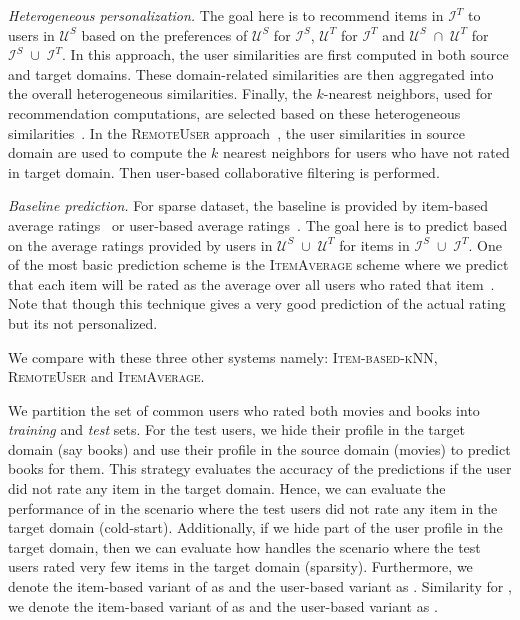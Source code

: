{\it Heterogeneous personalization.} The goal here is to recommend items in $\mathcal{I}^T$ to users in $\mathcal{U}^S$ based on the preferences of $\mathcal{U}^S$ for $\mathcal{I}^S$, $\mathcal{U}^T$ for $\mathcal{I}^T$ and $\mathcal{U}^S\; \cap\; \mathcal{U}^T$ for $\mathcal{I}^S\; \cup\; \mathcal{I}^T$. In this approach, the user similarities are first computed in both source and target domains. These domain-related similarities are then aggregated into the overall heterogeneous similarities. Finally, the $k$-nearest neighbors, used for recommendation computations, are selected based on these heterogeneous similarities~\cite{berkovsky2007cross}. In the \textsc{RemoteUser} approach~\cite{berkovsky2007cross}, the user similarities in source domain are used to compute the $k$ nearest neighbors for users who have not rated in target domain. Then user-based collaborative filtering is performed.

{\it Baseline prediction.} For sparse dataset, the baseline is provided by item-based average ratings~\cite{baltrunas2009context} or user-based average ratings~\cite{lemire2005slope}. The goal here is to predict based on the average ratings provided by users in $\mathcal{U}^S\; \cup\; \mathcal{U}^T$ for items in $\mathcal{I}^S\; \cup\; \mathcal{I}^T$. One of the most basic prediction scheme is the \textsc{ItemAverage} scheme where we predict that each item will be rated as the average over all users who rated that item~\cite{baltrunas2009context}. Note that though this technique gives a very good prediction of the actual rating but its not personalized.%

We compare \crossrec with these three other systems namely: \textsc{Item-based-kNN}, \textsc{RemoteUser} and \textsc{ItemAverage}.

 We partition the set of common users who rated both movies and books into \emph{training} and \emph{test} sets. For the test users, we hide their profile in the target domain (say books) and use their profile in the source domain (movies) to predict books for them. This strategy evaluates the accuracy of the predictions if the user did not rate any item in the target domain. Hence, we can evaluate the performance of \crossrec in the scenario where the test users did not rate any item in the target domain (cold-start). Additionally, if we hide part of the user profile in the target domain, then we can evaluate how \crossrec handles the scenario where the test users rated very few items in the target domain (sparsity). Furthermore, we denote the item-based variant of \crossrec as \crossrecib and the user-based variant as \crossrecub. Similarity for \npcrossrec, we denote the item-based variant of \npcrossrec as \npcrossrecib and the user-based variant as \npcrossrecub.

